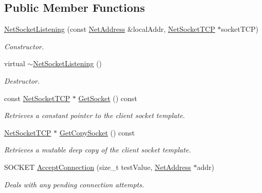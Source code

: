 \subsection*{Public Member Functions}
\begin{DoxyCompactItemize}
\item 
\hyperlink{class_net_socket_listening_af0a54f8ad6401c0121a58e9d4649f153}{NetSocketListening} (const \hyperlink{class_net_address}{NetAddress} \&localAddr, \hyperlink{class_net_socket_t_c_p}{NetSocketTCP} $\ast$socketTCP)
\begin{DoxyCompactList}\small\item\em Constructor. \item\end{DoxyCompactList}\item 
\hypertarget{class_net_socket_listening_af3c42d13c13a61e717c49825a9dced5c}{
virtual \hyperlink{class_net_socket_listening_af3c42d13c13a61e717c49825a9dced5c}{$\sim$NetSocketListening} ()}
\label{class_net_socket_listening_af3c42d13c13a61e717c49825a9dced5c}

\begin{DoxyCompactList}\small\item\em Destructor. \item\end{DoxyCompactList}\item 
const \hyperlink{class_net_socket_t_c_p}{NetSocketTCP} $\ast$ \hyperlink{class_net_socket_listening_ab350cd4d7db17d7c602396066182295d}{GetSocket} () const 
\begin{DoxyCompactList}\small\item\em Retrieves a constant pointer to the client socket template. \item\end{DoxyCompactList}\item 
\hyperlink{class_net_socket_t_c_p}{NetSocketTCP} $\ast$ \hyperlink{class_net_socket_listening_a596f25dd3f4c8efa4e4e87e4529f87f9}{GetCopySocket} () const 
\begin{DoxyCompactList}\small\item\em Retrieves a mutable deep copy of the client socket template. \item\end{DoxyCompactList}\item 
SOCKET \hyperlink{class_net_socket_listening_a805f004ca169dc6dadd9863f06be65b5}{AcceptConnection} (size\_\-t testValue, \hyperlink{class_net_address}{NetAddress} $\ast$addr)
\begin{DoxyCompactList}\small\item\em Deals with any pending connection attempts. \item\end{DoxyCompactList}\end{DoxyCompactItemize}
